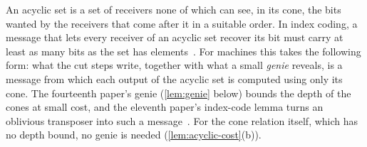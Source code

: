 An acyclic set is a set of receivers none of which can see, in its cone, the bits wanted by the receivers that come after it in
a suitable order. In index coding, a message that lets every receiver of an acyclic set recover its bit must carry at least as
many bits as the set has elements~\cite{BBJK2011}. For machines this takes the following form: what the cut steps write, together
with what a small \emph{genie} reveals, is a message from which each output of the acyclic set is computed using only its cone.
The fourteenth paper's genie (\cref{lem:genie} below) bounds the depth of the cones at small cost, and the eleventh paper's
index-code lemma turns an oblivious transposer into such a message~\cite{MergeDepth2026}. For the cone relation itself, which has
no depth bound, no genie is needed (\cref{lem:acyclic-cost}(b)).
